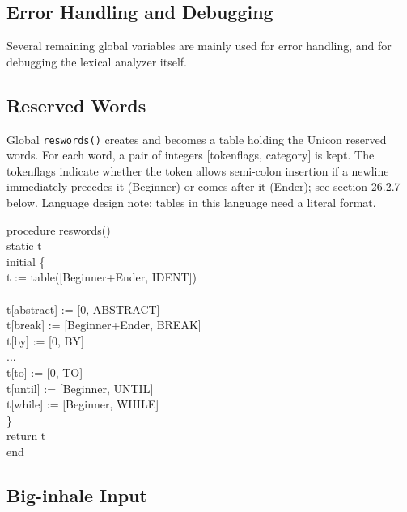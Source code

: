 
\subsection{Error Handling and Debugging}

Several remaining global variables are mainly used for error handling,
and for debugging the lexical analyzer itself.

\subsection{Reserved Words}

Global \texttt{reswords()} creates and becomes a table holding the
Unicon reserved words. For each word, a pair of integers [tokenflags,
category] is kept.  The tokenflags indicate whether the token allows
semi-colon insertion if a newline immediately precedes it (Beginner)
or comes after it (Ender); see section 26.2.7 below. Language design
note: tables in this language need a literal format.

\begin{iconcode}
procedure reswords() \\
static t \\
initial \{ \\
\>   t := table([Beginner+Ender, IDENT]) \\
\ \\
\>   t[{\textquotedbl}abstract{\textquotedbl}] := [0, ABSTRACT] \\
\>   t[{\textquotedbl}break{\textquotedbl}] := [Beginner+Ender, BREAK] \\
\>   t[{\textquotedbl}by{\textquotedbl}] := [0, BY] \\

\>   ... \\

\>   t[{\textquotedbl}to{\textquotedbl}] := [0, TO] \\
\>   t[{\textquotedbl}until{\textquotedbl}] := [Beginner, UNTIL] \\
\>   t[{\textquotedbl}while{\textquotedbl}] := [Beginner, WHILE] \\
\>   \} \\

return t \\
end
\end{iconcode}

\subsection{Big-inhale Input}


